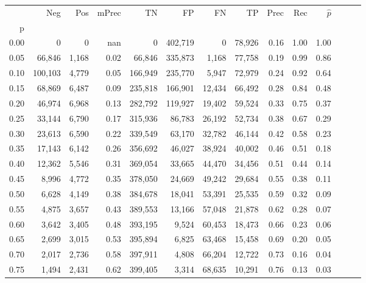 \begin{tabular}{rrrrrrrrrrrrrr}
\toprule
{} &      Neg &    Pos & mPrec &       TN &       FP &      FN &      TP &  Prec &   Rec & $\hat{p}$ \\
p    &          &        &       &          &          &         &         &       &       &           \\
\midrule
0.00 &        0 &      0 &   nan &        0 &  402,719 &       0 &  78,926 &  0.16 &  1.00 &      1.00 \\
0.05 &   66,846 &  1,168 &  0.02 &   66,846 &  335,873 &   1,168 &  77,758 &  0.19 &  0.99 &      0.86 \\
0.10 &  100,103 &  4,779 &  0.05 &  166,949 &  235,770 &   5,947 &  72,979 &  0.24 &  0.92 &      0.64 \\
0.15 &   68,869 &  6,487 &  0.09 &  235,818 &  166,901 &  12,434 &  66,492 &  0.28 &  0.84 &      0.48 \\
0.20 &   46,974 &  6,968 &  0.13 &  282,792 &  119,927 &  19,402 &  59,524 &  0.33 &  0.75 &      0.37 \\
0.25 &   33,144 &  6,790 &  0.17 &  315,936 &   86,783 &  26,192 &  52,734 &  0.38 &  0.67 &      0.29 \\
0.30 &   23,613 &  6,590 &  0.22 &  339,549 &   63,170 &  32,782 &  46,144 &  0.42 &  0.58 &      0.23 \\
0.35 &   17,143 &  6,142 &  0.26 &  356,692 &   46,027 &  38,924 &  40,002 &  0.46 &  0.51 &      0.18 \\
0.40 &   12,362 &  5,546 &  0.31 &  369,054 &   33,665 &  44,470 &  34,456 &  0.51 &  0.44 &      0.14 \\
0.45 &    8,996 &  4,772 &  0.35 &  378,050 &   24,669 &  49,242 &  29,684 &  0.55 &  0.38 &      0.11 \\
0.50 &    6,628 &  4,149 &  0.38 &  384,678 &   18,041 &  53,391 &  25,535 &  0.59 &  0.32 &      0.09 \\
0.55 &    4,875 &  3,657 &  0.43 &  389,553 &   13,166 &  57,048 &  21,878 &  0.62 &  0.28 &      0.07 \\
0.60 &    3,642 &  3,405 &  0.48 &  393,195 &    9,524 &  60,453 &  18,473 &  0.66 &  0.23 &      0.06 \\
0.65 &    2,699 &  3,015 &  0.53 &  395,894 &    6,825 &  63,468 &  15,458 &  0.69 &  0.20 &      0.05 \\
0.70 &    2,017 &  2,736 &  0.58 &  397,911 &    4,808 &  66,204 &  12,722 &  0.73 &  0.16 &      0.04 \\
0.75 &    1,494 &  2,431 &  0.62 &  399,405 &    3,314 &  68,635 &  10,291 &  0.76 &  0.13 &      0.03 \\

\end{tabular}
